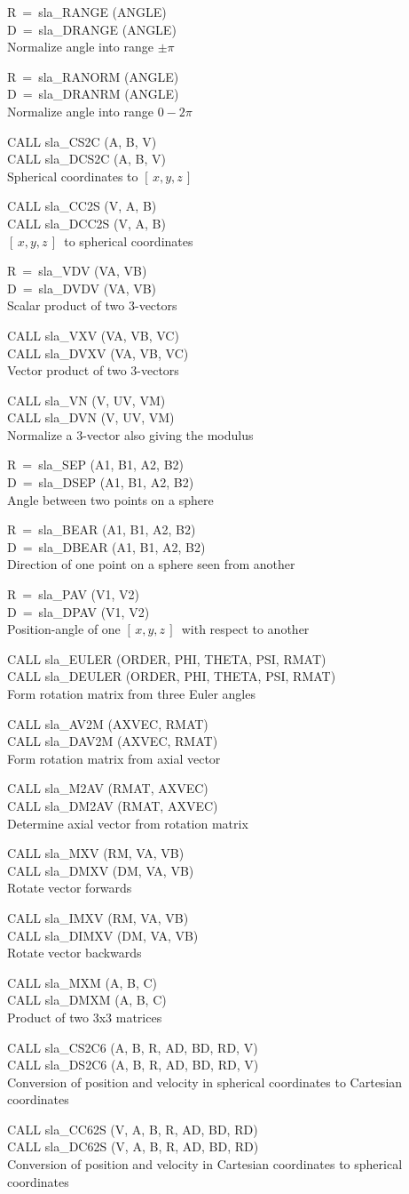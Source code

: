 \documentclass[11pt,twoside]{article}
\newcommand{\xyz}       {$[\,x,y,z\,]$}
\newcommand{\callhead}[1]{\goodbreak\vspace{\bigskipamount}{\large\bf{#1}}}
\newenvironment{callset}{\begin{list}{}{\setlength{\leftmargin}{2cm}
                             \setlength{\parsep}{\smallskipamount}}}{\end{list}}
\newcommand{\subq}[2]{\item\hspace{-1cm}#1\\\hspace*{-1cm}#2\\}
\begin{document}
\callhead{Angles, Vectors and Rotation Matrices}
\begin{callset}
\subq{R~=~sla\_RANGE (ANGLE)}
     {D~=~sla\_DRANGE (ANGLE)}
   Normalize angle into range $\pm\pi$
\subq{R~=~sla\_RANORM (ANGLE)}
     {D~=~sla\_DRANRM (ANGLE)}
   Normalize angle into range $0\!-\!2\pi$
\subq{CALL sla\_CS2C (A, B, V)}
     {CALL sla\_DCS2C (A, B, V)}
   Spherical coordinates to \xyz
\subq{CALL sla\_CC2S (V, A, B)}
     {CALL sla\_DCC2S (V, A, B)}
   \xyz\ to spherical coordinates
\subq{R~=~sla\_VDV (VA, VB)}
     {D~=~sla\_DVDV (VA, VB)}
   Scalar product of two 3-vectors
\subq{CALL sla\_VXV (VA, VB, VC)}
     {CALL sla\_DVXV (VA, VB, VC)}
   Vector product of two 3-vectors
\subq{CALL sla\_VN (V, UV, VM)}
     {CALL sla\_DVN (V, UV, VM)}
   Normalize a 3-vector also giving the modulus
\subq{R~=~sla\_SEP (A1, B1, A2, B2)}
     {D~=~sla\_DSEP (A1, B1, A2, B2)}
   Angle between two points on a sphere
\subq{R~=~sla\_BEAR (A1, B1, A2, B2)}
     {D~=~sla\_DBEAR (A1, B1, A2, B2)}
   Direction of one point on a sphere seen from another
\subq{R~=~sla\_PAV (V1, V2)}
     {D~=~sla\_DPAV (V1, V2)}
   Position-angle of one \xyz\ with respect to another
\subq{CALL sla\_EULER (ORDER, PHI, THETA, PSI, RMAT)}
     {CALL sla\_DEULER (ORDER, PHI, THETA, PSI, RMAT)}
   Form rotation matrix from three Euler angles
\subq{CALL sla\_AV2M (AXVEC, RMAT)}
     {CALL sla\_DAV2M (AXVEC, RMAT)}
   Form rotation matrix from axial vector
\subq{CALL sla\_M2AV (RMAT, AXVEC)}
     {CALL sla\_DM2AV (RMAT, AXVEC)}
   Determine axial vector from rotation matrix
\subq{CALL sla\_MXV (RM, VA, VB)}
     {CALL sla\_DMXV (DM, VA, VB)}
   Rotate vector forwards
\subq{CALL sla\_IMXV (RM, VA, VB)}
     {CALL sla\_DIMXV (DM, VA, VB)}
   Rotate vector backwards
\subq{CALL sla\_MXM (A, B, C)}
     {CALL sla\_DMXM (A, B, C)}
   Product of two 3x3 matrices
\subq{CALL sla\_CS2C6 (A, B, R, AD, BD, RD, V)}
     {CALL sla\_DS2C6 (A, B, R, AD, BD, RD, V)}
   Conversion of position and velocity in spherical
     coordinates to Cartesian coordinates
\subq{CALL sla\_CC62S (V, A, B, R, AD, BD, RD)}
     {CALL sla\_DC62S (V, A, B, R, AD, BD, RD)}
   Conversion of position and velocity in Cartesian
     coordinates to spherical coordinates
\end{callset}
\end{document}
